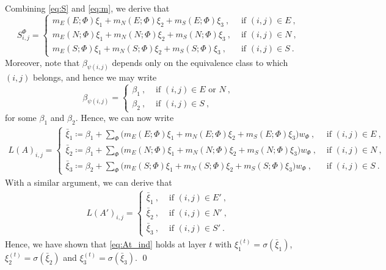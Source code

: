 \documentclass{article}
\begin{document}
Combining \eqref{eq:S} and \eqref{eq:m}, we derive that
\begin{equation*}
    S^{\Phi}_{i, j} = \begin{cases}
        m_E(E; \Phi) \xi_1 + m_N(E; \Phi) \xi_2 + m_S(E; \Phi) \xi_3~,& \text{ if } (i, j) \in E~, \\
        m_E(N; \Phi) \xi_1 + m_N(N; \Phi) \xi_2 + m_S(N; \Phi) \xi_3~,& \text{ if } (i, j) \in N~, \\
        m_E(S; \Phi) \xi_1 + m_N(S; \Phi) \xi_2 + m_S(S; \Phi) \xi_3~,& \text{ if } (i, j) \in S~.
    \end{cases}
\end{equation*}
Moreover, note that $\beta_{\psi(i, j)}$ depends only on the equivalence class to which $(i, j)$ belongs, and hence we may write
\begin{equation*}
    \beta_{\psi(i, j)} = \begin{cases}
        \beta_1~,& \text{ if } (i, j) \in E \text{ or } N~, \\
        \beta_2~,& \text{ if } (i, j) \in S~,
    \end{cases}
\end{equation*}
for some $\beta_1$ and $\beta_2$. Hence, we can now write
\begin{align*}
    L(A)_{i, j} = \begin{cases}
        \bar{\xi}_1 \coloneqq \beta_1 + \sum_\Phi \big ( m_E(E; \Phi) \xi_1 + m_N(E; \Phi) \xi_2 + m_S(E; \Phi) \xi_3 \big ) w_\Phi~,& \text{ if } (i, j) \in E~, \\
        \bar{\xi}_2 \coloneqq \beta_1 + \sum_\Phi \big ( m_E(N; \Phi) \xi_1 + m_N(N; \Phi) \xi_2 + m_S(N; \Phi) \xi_3 \big ) w_\Phi~,& \text{ if } (i, j) \in N~, \\
        \bar{\xi}_3 \coloneqq \beta_2 + \sum_\Phi \big ( m_E(S; \Phi) \xi_1 + m_N(S; \Phi) \xi_2 + m_S(S; \Phi) \xi_3 \big ) w_\Phi~,& \text{ if } (i, j) \in S~.
    \end{cases}
\end{align*}
With a similar argument, we can derive that 
\begin{align*}
    L(A')_{i, j} = \begin{cases}
        \bar{\xi}_1~,& \text{ if } (i, j) \in E'~, \\
        \bar{\xi}_2~,& \text{ if } (i, j) \in N'~, \\
        \bar{\xi}_3~,& \text{ if } (i, j) \in S'~.
    \end{cases}
\end{align*}
Hence, we have shown that \eqref{eq:At_ind} holds at layer $t$ with $\xi_1^{(t)} = \sigma(\bar{\xi}_1)$, $\xi_2^{(t)} = \sigma(\bar{\xi}_2)$ and $\xi_3^{(t)} = \sigma(\bar{\xi}_3)$. \qed
\end{document}
